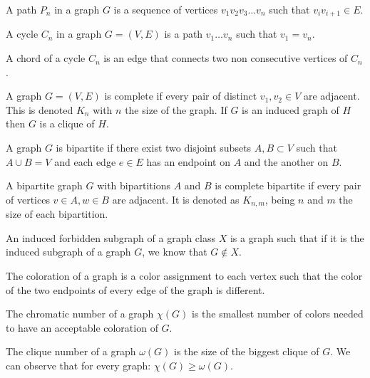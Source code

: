 \begin{defn}
  A path $P_n$ in a graph $G$ is a sequence of vertices $v_1v_2v_3\dots v_n$ such
  that $v_iv_{i+1} \in E$.
\end{defn}

\begin{defn}
  A cycle $C_n$ in a graph $G = (V,E)$ is a path $v_1\dots v_n$ such that $v_1 = v_n$.
\end{defn}

\begin{defn}
  A chord of a cycle $C_n$ is an edge that connects two non consecutive vertices
  of $C_n$.
\end{defn}

\begin{defn}
  A graph $G = (V,E)$ is complete if every pair of distinct $v_1,v_2 \in V$ are
  adjacent. This is denoted $K_n$ with $n$ the size of the graph. If $G$ is an
  induced graph of $H$ then $G$ is a clique of $H$.
\end{defn}

\begin{defn}
  A graph $G$ is bipartite if there exist two disjoint subsets $A,B \subset V$ such
  that $A\cup B = V$ and each edge $e\in E$ has an endpoint on $A$ and the
  another on $B$.
\end{defn}

\begin{defn}
  A bipartite graph $G$ with bipartitions $A$ and $B$ is complete bipartite if
  every pair of vertices $v\in A, w\in B$ are adjacent. It is denoted as $K_{n,m}$,
  being $n$ and $m$ the size of each bipartition.
\end{defn}

\begin{defn}
  An induced forbidden subgraph of a graph class $X$ is a graph such that if it is the induced
  subgraph of a graph $G$, we know that $G \notin X$.
\end{defn}

The coloration of a graph is a color assignment to each vertex such that the color
of the two endpoints of every edge of the graph is different.

\begin{defn}
  The chromatic number of a graph $\chi(G)$ is the smallest number of colors needed to
  have an acceptable coloration of $G$.
\end{defn}

\begin{defn}
  The clique number of a graph $\omega(G)$ is the size of the biggest clique of $G$. We
  can observe that for every graph: $\chi(G) \geq \omega(G)$.
\end{defn}

